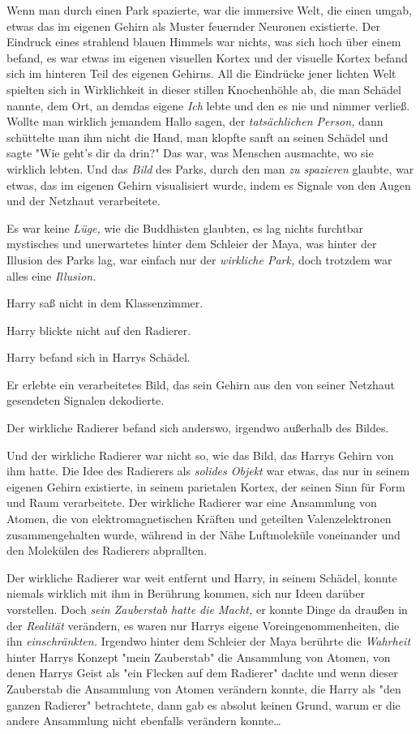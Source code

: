 {Wenn man durch einen Park spazierte, war die immersive Welt, die einen umgab, etwas das im eigenen Gehirn als Muster feuernder Neuronen existierte. Der Eindruck eines strahlend blauen Himmels war nichts, was sich hoch über einem befand, es war etwas im eigenen visuellen Kortex und der visuelle Kortex befand sich im hinteren Teil des eigenen Gehirns. All die Eindrücke jener lichten Welt spielten sich in Wirklichkeit in dieser stillen Knochenhöhle ab, die man Schädel nannte, dem Ort, an demdas eigene \emph{Ich} lebte und den es nie und nimmer verließ. Wollte man wirklich jemandem Hallo sagen, der \emph{tatsächlichen Person,} dann schüttelte man ihm nicht die Hand, man klopfte sanft an seinen Schädel und sagte "Wie geht's dir da drin?" Das war, was Menschen ausmachte, wo sie wirklich lebten. Und das \emph{Bild} des Parks, durch den man \emph{zu spazieren} glaubte, war etwas, das im eigenen Gehirn visualisiert wurde, indem es Signale von den Augen und der Netzhaut verarbeitete.

Es war keine \emph{Lüge,} wie die Buddhisten glaubten, es lag nichts furchtbar mystisches und unerwartetes hinter dem Schleier der Maya, was hinter der Illusion des Parks lag, war einfach nur der \emph{wirkliche Park,} doch trotzdem war alles eine \emph{Illusion.}

Harry saß nicht in dem Klassenzimmer.

Harry blickte nicht auf den Radierer.

Harry befand sich in Harrys Schädel.

Er erlebte ein verarbeitetes Bild, das sein Gehirn aus den von seiner Netzhaut gesendeten Signalen dekodierte.

Der wirkliche Radierer befand sich anderswo, irgendwo außerhalb des Bildes.

Und der wirkliche Radierer war nicht so, wie das Bild, das Harrys Gehirn von ihm hatte. Die Idee des Radierers als \emph{solides Objekt} war etwas, das nur in seinem eigenen Gehirn existierte, in seinem parietalen Kortex, der seinen Sinn für Form und Raum verarbeitete. Der wirkliche Radierer war eine Ansammlung von Atomen, die von elektromagnetischen Kräften und geteilten Valenzelektronen zusammengehalten wurde, während in der Nähe Luftmoleküle voneinander und den Molekülen des Radierers abprallten.

Der wirkliche Radierer war weit entfernt und Harry, in seinem Schädel, konnte niemals wirklich mit ihm in Berührung kommen, sich nur Ideen darüber vorstellen. Doch \emph{sein Zauberstab hatte die Macht,} er konnte Dinge da draußen in der \emph{Realität} verändern, es waren nur Harrys eigene Voreingenommenheiten, die ihn \emph{einschränkten.} Irgendwo hinter dem Schleier der Maya berührte die \emph{Wahrheit} hinter Harrys Konzept "mein Zauberstab" die Ansammlung von Atomen, von denen Harrys Geist als "ein Flecken auf dem Radierer" dachte und wenn dieser Zauberstab die Ansammlung von Atomen verändern konnte, die Harry als "den ganzen Radierer" betrachtete, dann gab es absolut keinen Grund, warum er die andere Ansammlung nicht ebenfalls verändern konnte…

}
